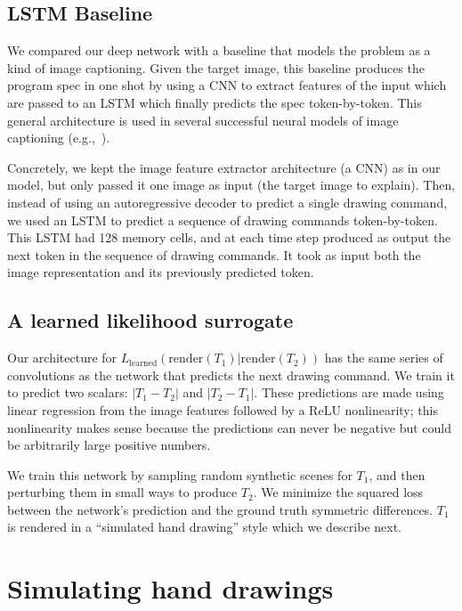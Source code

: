 \documentclass{article}
\begin{document}
\subsection{LSTM Baseline}

We  compared our deep network with a baseline that models the problem as a kind of image captioning.
Given the target image, this baseline produces the program spec in one shot by
using a CNN to extract features of the input which are passed to an LSTM which finally predicts
the spec token-by-token.
This general architecture is used in several successful neural models of image captioning (e.g.,~\cite{vinyals2015show}).

Concretely, we kept the image feature extractor architecture (a CNN) as in our model,
but only passed it one image as input (the target image to explain).
Then, instead of using an autoregressive decoder to predict a single drawing command,
we used an LSTM to predict a sequence of drawing commands token-by-token.
This LSTM had 128 memory cells,
and at each time step produced as output the next token in the sequence of drawing commands.
It took as input both the image representation and its previously predicted token.


\subsection{A learned likelihood surrogate}

Our architecture for
$L_{\text{learned}}(\text{render}(T_1)|\text{render}(T_2))$ has the
same series of convolutions as the network that predicts the next
drawing command. We train it to predict two scalars: $|T_1 - T_2|$ and
$|T_2 - T_1|$.  These predictions are made using linear regression
from the image features followed by a ReLU nonlinearity; this
nonlinearity makes sense because the predictions can never be negative
but could be arbitrarily large positive numbers.

We train this network by sampling random synthetic scenes for $T_1$,
and then perturbing them in small ways to produce $T_2$.
We minimize the squared loss between the network's prediction and the ground truth symmetric differences.
$T_1$ is rendered in a ``simulated hand drawing'' style which we describe next.

\section{Simulating hand drawings}
\end{document}

